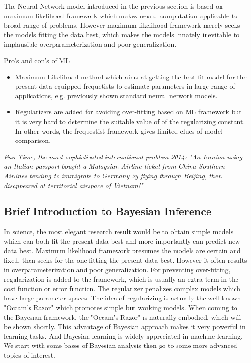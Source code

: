 \documentclass[paper=a4, fontsize=12pt]{scrartcl}	%
\numberwithin{equation}{section}					%
\numberwithin{figure}{section}					%
\numberwithin{table}{section}					%
\begin{document}
The Neural Network model introduced in the previous section is based on maximum likelihood framework which makes neural computation applicable to broad range of problems. However maximum likelihood framework merely seeks the models fitting the data best, which makes the models innately inevitable to implausible overparameterization and poor generalization. 

Pro's and con's of ML
\begin{itemize}
\item Maximum Likelihood method which aims at getting the best fit model for the present data equipped frequetists to estimate parameters in large range of applications, e.g. previously shown standard neural network models.
\item Regularizers are added for avoiding over-fitting based on ML framework but it is very hard to determine the suitable value of of the regularizing constant. In other words, the frequestist framework gives limited clues of model comparison. 
\end{itemize}


{\it Fun Time, the most sophisticated international problem 2014: "An Iranian using an Italian passport bought a Malaysian Airline ticket from China Southern Airlines tending to immigrate to Germany by flying through Beijing, then disappeared at territorial airspace of Vietnam!"}
\subsection{Brief Introduction to Bayesian Inference}
In science, the most elegant research result would be to obtain simple models which can both fit the present data best and more importantly can predict new data best. Maximum likelihood framework presumes the models are certain and fixed, then seeks for the one fitting the present data best. However it often results in overparameterization and poor generalization. For preventing over-fitting, regularization is added to the framework, which is usually an extra term in the cost function or error function. The regularizer penalizes complex models which have large parameter spaces. The idea of regularizing is actually the well-known "Occam's Razor" which promotes simple but working models. When coming to the Bayesian framework, the "Occam's Razor" is naturally embodied, which will be shown shortly. This advantage of Bayesian approach makes it very powerful in learning tasks. And Bayesian learning is widely appreciated in machine learning. We start with some bases of Bayesian analysis then go to some more advanced topics of interest. 
\end{document}
